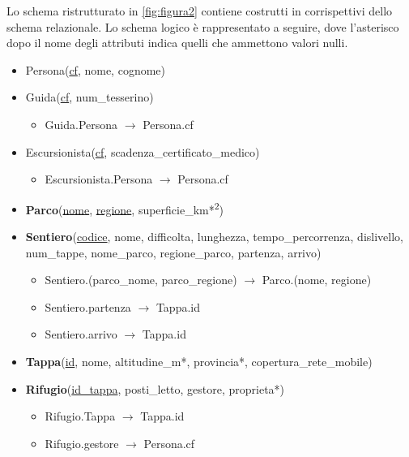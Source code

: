 \documentclass[10pt, a4paper]{article}
\begin{document}
Lo schema ristrutturato in \autoref{fig:figura2} contiene costrutti in corrispettivi dello schema relazionale. Lo schema logico è rappresentato a seguire, dove l’asterisco dopo il nome degli attributi indica quelli che ammettono valori nulli.
\begin{itemize}
    \item Persona(\underline{cf}, nome, cognome)

    \item Guida(\underline{cf}, num\_tesserino)
    \begin{itemize}
        \item Guida.Persona $\rightarrow$ Persona.cf
    \end{itemize}

    \item Escursionista(\underline{cf}, scadenza\_certificato\_medico)
    \begin{itemize}
        \item Escursionista.Persona $\rightarrow$ Persona.cf
    \end{itemize}

    \item \textbf{Parco}(\underline{nome}, \underline{regione}, superficie\_km*\textsuperscript{2})

    \item \textbf{Sentiero}(\underline{codice}, nome, difficolta, lunghezza, tempo\_percorrenza, dislivello, num\_tappe, nome\_parco, regione\_parco, partenza, arrivo)
    \begin{itemize}
        \item Sentiero.(parco\_nome, parco\_regione) $\rightarrow$ Parco.(nome, regione)
        \item Sentiero.partenza $\rightarrow$ Tappa.id
        \item Sentiero.arrivo $\rightarrow$ Tappa.id
    \end{itemize}

    \item \textbf{Tappa}(\underline{id}, nome, altitudine\_m*, provincia*, copertura\_rete\_mobile)

    \item \textbf{Rifugio}(\underline{id\_tappa}, posti\_letto, gestore, proprieta*)
    \begin{itemize}
        \item Rifugio.Tappa $\rightarrow$ Tappa.id
        \item Rifugio.gestore $\rightarrow$ Persona.cf
    \end{itemize}


\end{itemize}
\end{document}
